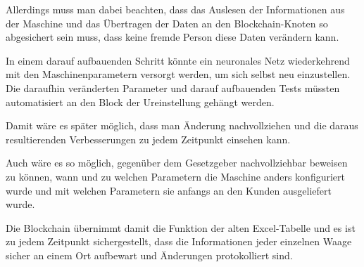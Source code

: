 Allerdings muss man dabei beachten, dass das Auslesen der Informationen aus der Maschine und das Übertragen der Daten
an den Blockchain-Knoten so abgesichert sein muss, dass keine fremde Person diese Daten verändern kann.

In einem darauf aufbauenden Schritt könnte ein neuronales Netz wiederkehrend mit den Maschinenparametern versorgt
werden, um sich selbst neu einzustellen. Die daraufhin veränderten Parameter und darauf aufbauenden Tests müssten
automatisiert an den Block der Ureinstellung gehängt werden.

Damit wäre es später möglich, dass man Änderung nachvollziehen und die daraus resultierenden Verbesserungen zu jedem
Zeitpunkt einsehen kann.

Auch wäre es so möglich, gegenüber dem Gesetzgeber nachvollziehbar beweisen zu können, wann und zu welchen Parametern
die Maschine anders konfiguriert wurde und mit welchen Parametern sie anfangs an den Kunden ausgeliefert wurde.

Die Blockchain übernimmt damit die Funktion der alten Excel-Tabelle und es ist zu jedem Zeitpunkt sichergestellt, dass
die Informationen jeder einzelnen Waage sicher an einem Ort aufbewart und Änderungen protokolliert sind.